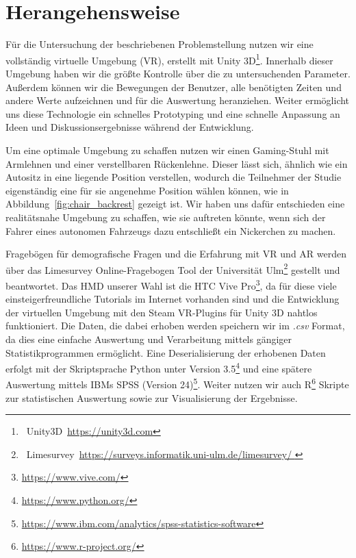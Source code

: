 \section{Herangehensweise}\label{sec:approach}  

Für die Untersuchung der beschriebenen Problemstellung nutzen wir eine vollständig virtuelle Umgebung (VR), erstellt mit Unity 3D\footnote{~Unity3D~\url{https://unity3d.com}}. Innerhalb dieser Umgebung haben wir die größte Kontrolle über die zu untersuchenden Parameter. Außerdem können wir die Bewegungen der Benutzer, alle benötigten Zeiten und andere Werte aufzeichnen und für die Auswertung heranziehen. Weiter ermöglicht uns diese Technologie ein schnelles Prototyping und eine schnelle Anpassung an Ideen und Diskussionsergebnisse während der Entwicklung.

Um eine optimale Umgebung zu schaffen nutzen wir einen Gaming-Stuhl mit Armlehnen und einer verstellbaren Rückenlehne. Dieser lässt sich, ähnlich wie ein Autositz in eine liegende Position verstellen, wodurch die Teilnehmer der Studie eigenständig eine für sie angenehme Position wählen können, wie in Abbildung~\ref{fig:chair_backrest} gezeigt ist. Wir haben uns dafür entschieden eine realitätsnahe Umgebung zu schaffen, wie sie auftreten könnte, wenn sich der Fahrer eines autonomen Fahrzeugs dazu entschließt ein Nickerchen zu machen.

Fragebögen für demografische Fragen und die Erfahrung mit VR und AR werden über das Limesurvey Online-Fragebogen Tool der Universität Ulm\footnote{~Limesurvey~\url{https://surveys.informatik.uni-ulm.de/limesurvey/
}} gestellt und beantwortet.
Das HMD unserer Wahl ist die HTC Vive Pro\footnote{\url{https://www.vive.com/}}, da für diese viele einsteigerfreundliche Tutorials im Internet vorhanden sind und die Entwicklung der virtuellen Umgebung mit den Steam VR-Plugins für Unity 3D nahtlos funktioniert. Die Daten, die dabei erhoben werden speichern wir im \textit{.csv} Format, da dies eine einfache Auswertung und Verarbeitung mittels gängiger Statistikprogrammen ermöglicht. Eine Deserialisierung der erhobenen Daten erfolgt mit der Skriptsprache Python unter Version 3.5\footnote{\url{https://www.python.org/}} und eine spätere Auswertung mittels IBMs SPSS (Version 24)\footnote{\url{https://www.ibm.com/analytics/spss-statistics-software}}. Weiter nutzen wir auch R\footnote{\url{https://www.r-project.org/}} Skripte zur statistischen Auswertung sowie zur Visualisierung der Ergebnisse. 
